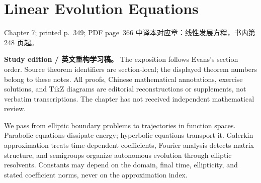 \chapter{Linear Evolution Equations}
\label{chap:linear-evolution-equations}

\PDESource
  {Chapter 7; printed p.~349; PDF page~366}
  {中译本对应章：线性发展方程，书内第 248 页起。}

\noindent\textbf{Study edition / 英文重构学习稿。}
The exposition follows Evans's section order. Source theorem identifiers are
section-local; the displayed theorem numbers belong to these notes.
All proofs, Chinese mathematical annotations, exercise solutions, and TikZ
diagrams are editorial reconstructions or supplements, not verbatim
transcriptions. The chapter has not received independent mathematical review.

\medskip
We pass from elliptic boundary problems to trajectories in function spaces.
Parabolic equations dissipate energy; hyperbolic equations transport it.
Galerkin approximation treats time-dependent coefficients, Fourier analysis
detects matrix structure, and semigroups organize autonomous evolution through
elliptic resolvents. Constants may depend on the domain, final time,
ellipticity, and stated coefficient norms, never on the approximation index.







